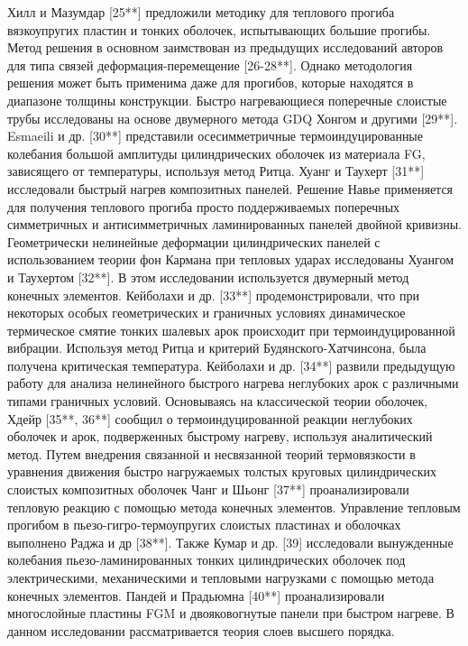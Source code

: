 Хилл и Мазумдар [25**] предложили методику для теплового прогиба вязкоупругих пластин и тонких оболочек, испытывающих большие прогибы. Метод решения в основном заимствован из предыдущих исследований авторов для типа связей деформация-перемещение [26-28**]. Однако методология решения может быть применима даже для прогибов, которые находятся в диапазоне толщины конструкции. Быстро нагревающиеся поперечные слоистые трубы исследованы на основе двумерного метода GDQ Хонгом и другими [29**]. Esmaeili и др. [30**] представили осесимметричные термоиндуцированные колебания большой амплитуды цилиндрических оболочек из материала FG, зависящего от температуры, используя метод Ритца. Хуанг и Таухерт [31**] исследовали быстрый нагрев композитных панелей. Решение Навье применяется для получения теплового прогиба просто поддерживаемых поперечных симметричных и антисимметричных ламинированных панелей двойной кривизны.  Геометрически нелинейные деформации цилиндрических панелей с использованием теории фон Кармана при тепловых ударах исследованы Хуангом и Таухертом [32**]. В этом исследовании используется двумерный метод конечных элементов. Кейболахи и др. [33**] продемонстрировали, что при некоторых особых геометрических и граничных условиях динамическое термическое смятие тонких шалевых арок происходит при термоиндуцированной вибрации. Используя метод Ритца и критерий Будянского-Хатчинсона, была получена критическая температура. Кейболахи и др. [34**] развили предыдущую работу для анализа нелинейного быстрого нагрева неглубоких арок с различными типами граничных условий. Основываясь на классической теории оболочек, Хдейр [35**, 36**] сообщил о термоиндуцированной реакции неглубоких оболочек и арок, подверженных быстрому нагреву, используя аналитический метод.  Путем внедрения связанной и несвязанной теорий термовязкости в уравнения движения быстро нагружаемых толстых круговых цилиндрических слоистых композитных оболочек Чанг и Шьонг [37**] проанализировали тепловую реакцию с помощью метода конечных элементов. Управление тепловым прогибом в пьезо-гигро-термоупругих слоистых пластинах и оболочках выполнено Раджа и др [38**]. Также Кумар и др. [39] исследовали вынужденные колебания пьезо-ламинированных тонких цилиндрических оболочек под электрическими, механическими и тепловыми нагрузками с помощью метода конечных элементов.  Пандей и Прадьюмна [40**] проанализировали многослойные пластины FGM и двояковогнутые панели при быстром нагреве.  В данном исследовании рассматривается теория слоев высшего порядка.


